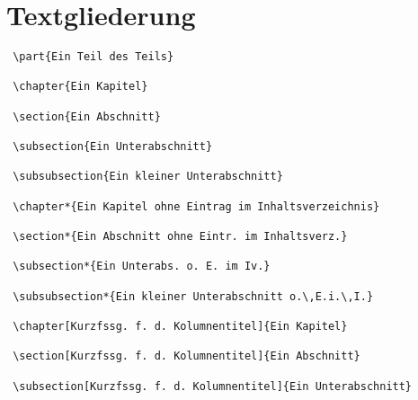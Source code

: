

\section{Textgliederung}

\begin{lstlisting}
 \part{Ein Teil des Teils}
 
 \chapter{Ein Kapitel}
 
 \section{Ein Abschnitt}
 
 \subsection{Ein Unterabschnitt}
 
 \subsubsection{Ein kleiner Unterabschnitt}
 
 \chapter*{Ein Kapitel ohne Eintrag im Inhaltsverzeichnis}
 
 \section*{Ein Abschnitt ohne Eintr. im Inhaltsverz.}
 
 \subsection*{Ein Unterabs. o. E. im Iv.}
 
 \subsubsection*{Ein kleiner Unterabschnitt o.\,E.i.\,I.}
 
 \chapter[Kurzfssg. f. d. Kolumnentitel]{Ein Kapitel}
 
 \section[Kurzfssg. f. d. Kolumnentitel]{Ein Abschnitt}
 
 \subsection[Kurzfssg. f. d. Kolumnentitel]{Ein Unterabschnitt}
\end{lstlisting}

